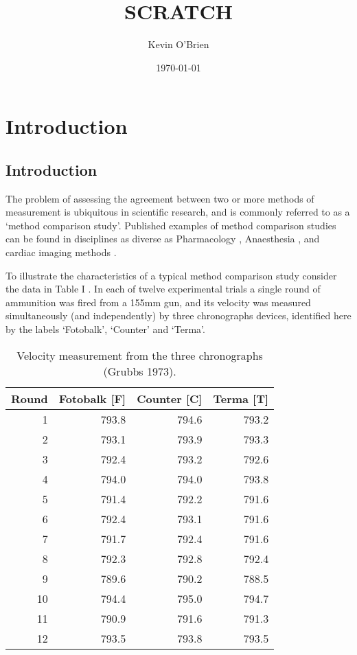 \documentclass[12pt, a4paper]{report}
\begin{document}
	\author{Kevin O'Brien}
	\title{SCRATCH}
	\date{\today}
	\maketitle
	
	\tableofcontents \setcounter{tocdepth}{2}

\chapter{Introduction}

\section{Introduction}
The problem of assessing the agreement between two or more methods
of measurement is ubiquitous in scientific research, and is
commonly referred to as a `method comparison study'. Published
examples of method comparison studies can be found in disciplines
as diverse as Pharmacology \citep{ludbrook97}, Anaesthesia
\citep{Myles}, and cardiac imaging methods \citep{Krumm}.
\smallskip

To illustrate the characteristics of a typical method comparison
study consider the data in Table I \citep{Grubbs73}. In each of
twelve experimental trials a single round of ammunition was fired
from a 155mm gun, and its velocity was measured simultaneously
(and independently) by three chronographs devices, identified here
by the labels `Fotobalk', `Counter' and `Terma'.
\smallskip


\newpage

\begin{table}[ht]
	\begin{center}
		\begin{tabular}{rrrr}
			\hline
			Round& Fotobalk [F] & Counter [C]& Terma [T]\\
			\hline
			1 & 793.8 & 794.6 & 793.2 \\
			2 & 793.1 & 793.9 & 793.3 \\
			3 & 792.4 & 793.2 & 792.6 \\
			4 & 794.0 & 794.0 & 793.8 \\
			5 & 791.4 & 792.2 & 791.6 \\
			6 & 792.4 & 793.1 & 791.6 \\
			7 & 791.7 & 792.4 & 791.6 \\
			8 & 792.3 & 792.8 & 792.4 \\
			9 & 789.6 & 790.2 & 788.5 \\
			10 & 794.4 & 795.0 & 794.7 \\
			11 & 790.9 & 791.6 & 791.3 \\
			12 & 793.5 & 793.8 & 793.5 \\
			\hline
		\end{tabular}
		\caption{Velocity measurement from the three chronographs (Grubbs
			1973).}
	\end{center}
\end{table}
\end{document}
